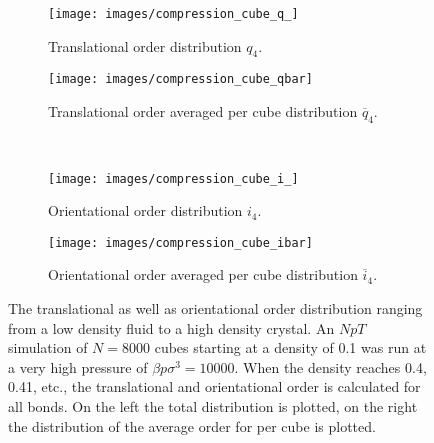 \documentclass[thesis]{subfiles}
\begin{document}
\begin{figure}[h]
	\centering
	\begin{subfigure}{0.48\textwidth}
		\centering
		\texttt{[image: images/compression\_cube\_q\_]}
		\caption{Translational order distribution $q_4$.}\label{fig:compression_cubea}
	\end{subfigure}
	\begin{subfigure}{0.51\textwidth}
		\centering
		\texttt{[image: images/compression\_cube\_qbar]}
		\caption{Translational order averaged per cube distribution $\overline q_4$.}\label{fig:compression_cubeb}
	\end{subfigure}\\\vspace{10pt}
	\begin{subfigure}{0.48\textwidth}
		\centering
		\texttt{[image: images/compression\_cube\_i\_]}
		\caption{Orientational order distribution $i_4$.}\label{fig:compression_cubec}
	\end{subfigure}
	\begin{subfigure}{0.51\textwidth}
		\centering
		\texttt{[image: images/compression\_cube\_ibar]}
		\caption{Orientational order averaged per cube distribution $\overline i_4$.}\label{fig:compression_cubed}
	\end{subfigure}
	\caption{The translational as well as orientational order distribution ranging from a low density fluid to a high density crystal. %
	An $NpT$ simulation of $N = 8000$ cubes starting at a density of 0.1 was run at a very high pressure of $\beta p \sigma^3 = 10000$. When the density reaches 0.4, 0.41, etc., the translational and orientational order is calculated for all bonds. On the left the total distribution is plotted, on the right the distribution of the average order for per cube is plotted.}
	\label{fig:compression_cube}
\end{figure}
\end{document}
